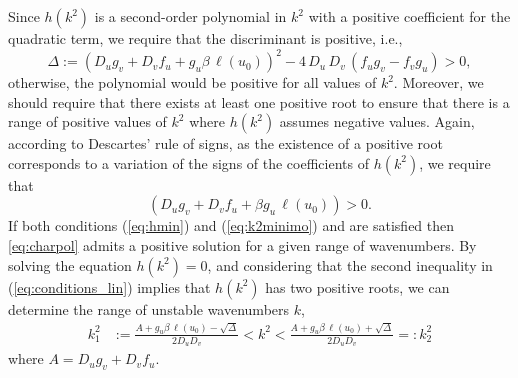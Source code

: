 \documentclass{article}
\begin{document}
{Since \( h(k^2) \) is a second-order polynomial in $k^2$ with a positive coefficient for the quadratic term, we require that the discriminant is positive, i.e.,
\begin{equation}\label{eq:hmin}
   \Delta:= \left(D_u g_v + D_v f_u + g_u \beta \,\ell(u_0)\right)^2 - 4 \, D_u \, D_v \, \left(f_u g_v - f_v g_u\right) > 0,
\end{equation}
otherwise, the polynomial would be positive for all values of \( k^2 \).
  Moreover, we should require that there exists at least one positive root to ensure that there is a range of positive values of \( k^2 \) where \( h(k^2) \) assumes negative values. Again, according to 
Descartes' rule of signs, as the existence of a positive root corresponds to a variation of the signs of {the coefficients of} $h(k^2)$, we require that  
\begin{equation}\label{eq:k2minimo}
    \left(D_u g_v + D_v f_u + \beta g_u \, \ell(u_0) \right) >0.
\end{equation}
If both conditions (\ref{eq:hmin}) and (\ref{eq:k2minimo}) and are satisfied then \eqref{eq:charpol} admits a positive solution for a given range of wavenumbers. By solving the equation \(h(k^2) = 0\), and considering that the second inequality in (\ref{eq:conditions_lin}) implies that \(h(k^2)\) has two positive roots, we can determine the range of unstable wavenumbers $k$,
\begin{equation}
\label{eq_range_wave}
    \begin{aligned}
    k_1^2 &:= \frac{A + g_u \beta  \, \ell(u_0) - \sqrt{\Delta}}{2 D_u D_v} < k^2 
    < \frac{A + g_u \beta \,\ell(u_0) +\sqrt{\Delta}}{2 D_u D_v} =: k_2^2 
    \end{aligned}
\end{equation}
where $A=D_u g_v + D_v f_u $.

}
\end{document}

